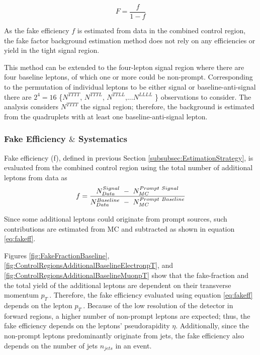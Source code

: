 \begin{equation}
    F =  \frac{f}{1-f}
\label{eqn:FakeFactor}
\end{equation}

As the fake efficiency $f$ is estimated from data in the combined control region, the fake factor background estimation method does not rely on any efficiencies or yield in the tight signal region.

This method can be extended to the four-lepton signal region where there are four baseline leptons, of which one or more could be non-prompt. Corresponding to the permutation of individual leptons to be either signal or baseline-anti-signal there are $2^{4}=16$ \{$N^{TTTT}$, $N^{TTTL}$, $N^{TTLL}$,...$N^{LLLL}$ \} observations to consider. The analysis considers $N^{TTTT}$ the signal region; therefore, the background is estimated from the quadruplets with at least one baseline-anti-signal lepton.

\subsubsection{Fake Efficiency $\&$ Systematics}
\label{subsubsec:FakeEff}
Fake efficiency (f), defined in previous Section \ref{subsubsec:EstimationStrategy}, is evaluated from the combined control region using the total number of additional leptons from data as
\begin{equation}{\label{eq:fakeff}}
\begin{aligned}
f = \frac{ N_{Data}^{Signal}~-~N_{MC}^{Prompt~Signal}}{ N_{Data}^{Baseline}~-~N_{MC}^{Prompt~Baseline}}
\end{aligned}
\end{equation}

Since some additional leptons could originate from prompt sources, such contributions are estimated from MC and subtracted as shown in equation \ref{eq:fakeff}.

Figures \ref{fig:FakeFractionBaseline}, \ref{fig:ControlRegionsAdditionalBaselineElectronpT}, and \ref{fig:ControlRegionsAdditionalBaselineMuonpT} show that the fake-fraction and the total yield of the additional leptons are dependent on their transverse momentum $p_{T}~$. Therefore, the fake efficiency evaluated using equation \ref{eq:fakeff} depends on the lepton $p_{T}~$. Because of the low resolution of the detector in forward regions, a higher number of non-prompt leptons are expected; thus, the fake efficiency depends on the leptons' pseudorapidity $\eta$. Additionally, since the non-prompt leptons predominantly originate from jets, the fake efficiency also depends on the number of jets $n_{jets}$ in an event. 


